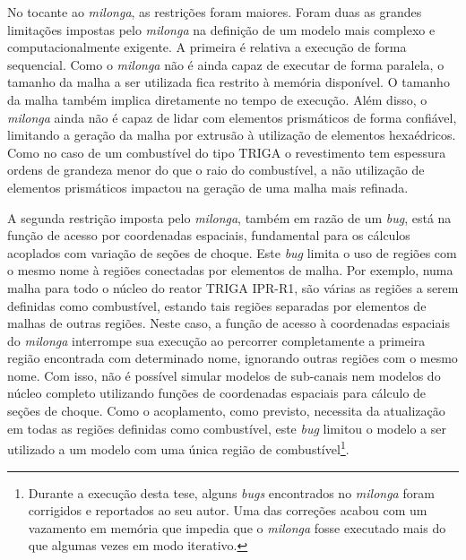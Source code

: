 No tocante ao \textit{milonga}, as restrições foram maiores. Foram duas as grandes limitações impostas
pelo \textit{milonga} na definição de um modelo mais complexo e computacionalmente exigente. A primeira
é relativa a execução de forma sequencial. Como o \textit{milonga} não é ainda capaz de executar de
forma paralela, o tamanho da malha a ser utilizada fica restrito à memória disponível.
O tamanho da malha também implica diretamente no tempo de execução.
Além disso, o \textit{milonga} ainda não é capaz de lidar com elementos prismáticos de forma confiável, limitando a
geração da malha por extrusão à utilização de elementos hexaédricos.
Como no caso de um combustível do tipo TRIGA o revestimento tem espessura ordens de grandeza
menor do que o raio do combustível, a não utilização de elementos prismáticos impactou na geração
de uma malha mais refinada.

A segunda restrição imposta pelo \textit{milonga}, também em razão de um \textit{bug}, está na função
de acesso por coordenadas espaciais, fundamental para os cálculos acoplados com variação de seções de choque.
Este \textit{bug} limita o uso de regiões com o mesmo nome à regiões conectadas por elementos de malha.
Por exemplo, numa malha para todo o núcleo do reator TRIGA IPR-R1, são várias as regiões a serem definidas
como combustível, estando
tais regiões separadas por elementos de malhas de outras regiões. Neste caso, a função de acesso
à coordenadas espaciais do \textit{milonga} interrompe sua execução ao percorrer completamente a primeira
região encontrada com determinado nome, ignorando outras regiões com o mesmo nome.
Com isso, não é possível simular modelos de sub-canais
nem modelos do núcleo completo utilizando funções de coordenadas espaciais para cálculo de seções de choque.
Como o acoplamento, como previsto, necessita da atualização em todas as regiões definidas como combustível,
este \textit{bug} limitou o modelo a ser utilizado a um modelo com uma única região de
combustível\footnote{Durante a execução desta tese, alguns \textit{bugs} encontrados
  no \textit{milonga} foram corrigidos e
  reportados ao seu autor. Uma das correções acabou com um vazamento em memória que impedia que o \textit{milonga}
  fosse executado mais do que algumas vezes em modo iterativo.}.





